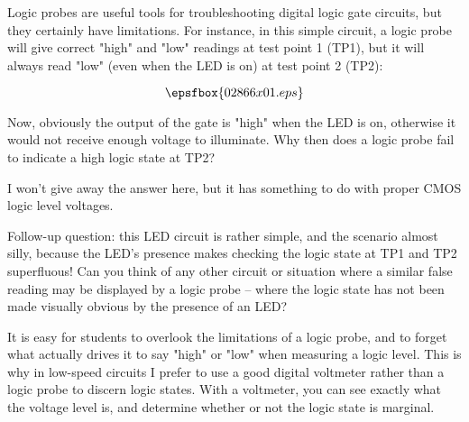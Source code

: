 

Logic probes are useful tools for troubleshooting digital logic gate circuits, but they certainly have limitations.  For instance, in this simple circuit, a logic probe will give correct "high" and "low" readings at test point 1 (TP1), but it will always read "low" (even when the LED is on) at test point 2 (TP2):

$$\epsfbox{02866x01.eps}$$

Now, obviously the output of the gate is "high" when the LED is on, otherwise it would not receive enough voltage to illuminate.  Why then does a logic probe fail to indicate a high logic state at TP2?







I won't give away the answer here, but it has something to do with proper CMOS logic level voltages.

\vskip 10pt

Follow-up question: this LED circuit is rather simple, and the scenario almost silly, because the LED's presence makes checking the logic state at TP1 and TP2 superfluous!  Can you think of any other circuit or situation where a similar false reading may be displayed by a logic probe -- where the logic state has not been made visually obvious by the presence of an LED?  







It is easy for students to overlook the limitations of a logic probe, and to forget what actually drives it to say "high" or "low" when measuring a logic level.  This is why in low-speed circuits I prefer to use a good digital voltmeter rather than a logic probe to discern logic states.  With a voltmeter, you can see exactly what the voltage level is, and determine whether or not the logic state is marginal.




